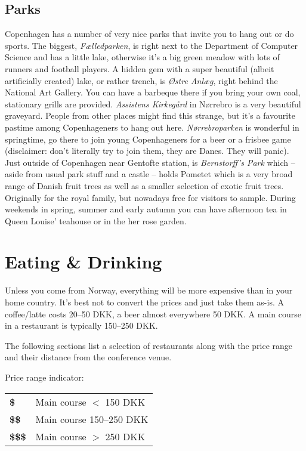 \begin{left}
\begin{eventitem}
\begin{eventitem}
\begin{eventitem}
\subsection{Parks}
Copenhagen has a number of very nice parks that invite you to hang out or do sports. The biggest, \textit{Fælledparken}, is right next to the Department of Computer Science and has a little lake, otherwise it’s a big green meadow with lots of runners and football players. A hidden gem with a super beautiful (albeit artificially created) lake, or rather trench, is \textit{Østre Anlæg}, right behind the National Art Gallery. You can have a barbeque there if you bring your own coal, stationary grills are provided. \textit{Assistens Kirkegård} in Nørrebro is a very beautiful graveyard. People from other places might find this strange, but it’s a favourite pastime among Copenhageners to hang out here. \textit{Nørrebroparken} is wonderful in springtime, go there to join young Copenhageners for a beer or a frisbee game (disclaimer: don’t literally try to join them, they are Danes. They will panic). Just outside of Copenhagen near Gentofte station, is \textit{Bernstorff’s Park} which – aside from usual park stuff and a castle – holds Pometet which is a very broad range of Danish fruit trees as well as a smaller selection of exotic fruit trees. Originally for the royal family, but nowadays free for visitors to sample. During weekends in spring, summer and early autumn you can have afternoon tea in Queen Louise’ teahouse or in the her rose garden. 



\section{Eating \& Drinking}
Unless you come from Norway, everything will be more expensive than in your home country. It’s best not to convert the prices and just take them as-is. A coffee/latte costs 20--50 DKK, a beer almost everywhere 50 DKK. A main course in a restaurant is typically 150–250 DKK.
\par
The following sections list a selection of restaurants along with the price range and their distance from the conference venue.
\par
\medskip
\noindent Price range indicator: 

\begin{tabular}{l l} 
\textbf{\$} &Main course $<$ 150 DKK\\
\textbf{\$\$}&Main course 150–250 DKK\\
\textbf{\$\$\$} &Main course $>$ 250 DKK
\end{tabular}




\end{eventitem}
\end{eventitem}
\end{eventitem}
\end{left}
